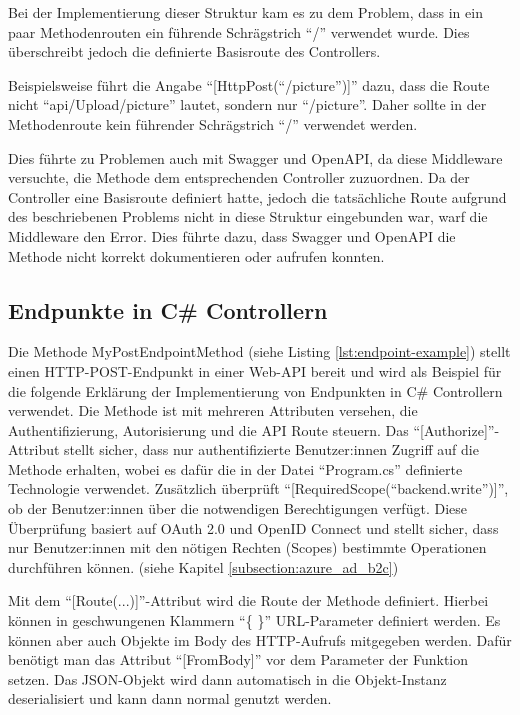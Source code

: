 Bei der Implementierung dieser Struktur kam es zu dem Problem, dass in ein paar Methodenrouten
ein führende Schrägstrich ``\slash'' verwendet wurde. Dies überschreibt jedoch die definierte
Basisroute des Controllers.

Beispielsweise führt die Angabe ``[HttpPost(``/picture'')]'' dazu, dass die Route nicht 
``api/Upload/picture'' lautet, sondern nur ``/picture''. Daher sollte in der Methodenroute 
kein führender Schrägstrich ``\slash'' verwendet werden.

Dies führte zu Problemen auch mit Swagger und OpenAPI, da diese Middleware versuchte, 
die Methode dem entsprechenden Controller zuzuordnen. Da der Controller eine Basisroute 
definiert hatte, jedoch die tatsächliche Route aufgrund des beschriebenen Problems nicht 
in diese Struktur eingebunden war, warf die Middleware den Error. Dies führte dazu, 
dass Swagger und OpenAPI die Methode nicht korrekt dokumentieren oder aufrufen konnten.

\subsection{Endpunkte in C\# Controllern}

Die Methode MyPostEndpointMethod (siehe Listing \ref{lst:endpoint-example}) stellt einen HTTP-POST-Endpunkt in einer Web-API bereit und
wird als Beispiel für die folgende Erklärung der Implementierung von Endpunkten in C\# Controllern
verwendet. Die Methode ist mit mehreren Attributen versehen, die Authentifizierung, 
Autorisierung und die API Route steuern. Das ``[Authorize]''-Attribut stellt sicher, 
dass nur authentifizierte Benutzer:innen Zugriff auf die Methode erhalten, wobei es dafür
die in der Datei ``Program.cs'' definierte Technologie verwendet. Zusätzlich überprüft 
``[RequiredScope(``backend.write'')]'', ob der Benutzer:innen über die notwendigen Berechtigungen 
verfügt. Diese Überprüfung basiert auf OAuth 2.0 und OpenID Connect und stellt sicher, 
dass nur Benutzer:innen mit den nötigen Rechten (Scopes) bestimmte Operationen durchführen können. 
(siehe Kapitel \ref{subsection:azure_ad_b2c})

Mit dem ``[Route(...)]''-Attribut wird die Route der Methode definiert. Hierbei können in
geschwungenen Klammern ``\{ \}'' URL-Parameter definiert werden. Es können aber auch 
Objekte im Body des HTTP-Aufrufs mitgegeben werden. Dafür benötigt man das 
Attribut ``[FromBody]'' vor dem Parameter der Funktion setzen. Das JSON-Objekt wird dann
automatisch in die Objekt-Instanz deserialisiert und kann dann normal genutzt werden. 

